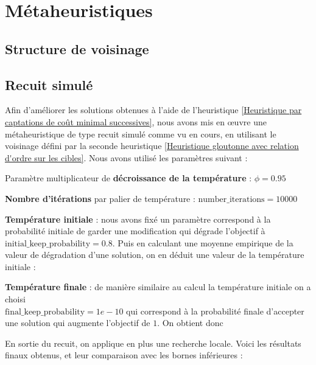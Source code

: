\documentclass[12pt]{article}
\begin{document}
\section{Métaheuristiques}

\subsection{Structure de voisinage}

\subsection{Recuit simulé}

Afin d'améliorer les solutions obtenues à l'aide de l'heuristique \ref{Heuristique par captations de coût minimal successives}, nous avons mis en \oe uvre une métaheuristique de type recuit simulé comme vu en cours, en utilisant le voisinage défini par la seconde heuristique \ref{Heuristique gloutonne avec relation d'ordre sur les cibles}. Nous avons utilisé les paramètres suivant :

\begin{bulletlist}
  \item Paramètre multiplicateur de \textbf{décroissance de la température} : $\phi=0.95$
  \item \textbf{Nombre d'itérations} par palier de température : $\text{number\_iterations} = 10000$
  \item \textbf{Température initiale} : nous avons fixé un paramètre correspond à la probabilité initiale de garder une modification qui dégrade l'objectif à $\text{initial\_keep\_probability} = 0.8$. Puis en calculant une moyenne empirique de la valeur de dégradation d'une solution, on en déduit une valeur de la température initiale : 
  \item \textbf{Température finale} : de manière similaire au calcul la température initiale on a choisi\\ $\text{final\_keep\_probability} = 1e-10$ qui correspond à la probabilité finale d'accepter une solution qui augmente l'objectif de $1$. On obtient donc 
\end{bulletlist}

En sortie du recuit, on applique en plus une recherche locale. Voici les résultats finaux obtenus, et leur comparaison avec les bornes inférieures :
\end{document}
